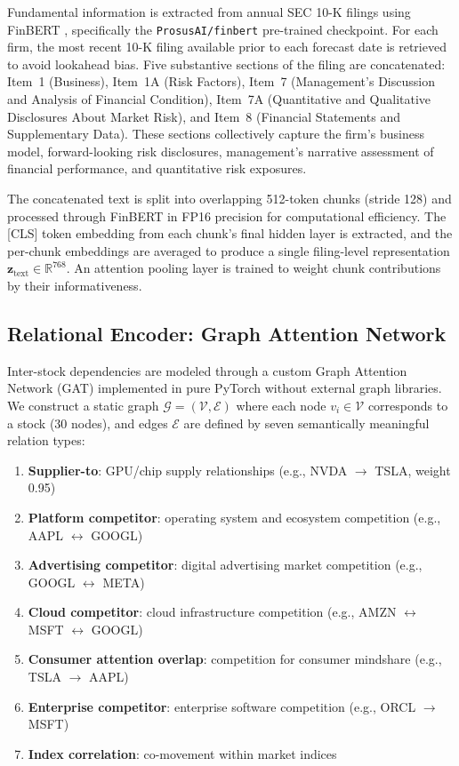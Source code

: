 \documentclass[12pt, a4paper]{article}
\begin{document}
Fundamental information is extracted from annual SEC 10-K filings using FinBERT \citep{yang2020finbert}, specifically the \texttt{ProsusAI/finbert} pre-trained checkpoint. For each firm, the most recent 10-K filing available prior to each forecast date is retrieved to avoid lookahead bias. Five substantive sections of the filing are concatenated: Item~1 (Business), Item~1A (Risk Factors), Item~7 (Management's Discussion and Analysis of Financial Condition), Item~7A (Quantitative and Qualitative Disclosures About Market Risk), and Item~8 (Financial Statements and Supplementary Data). These sections collectively capture the firm's business model, forward-looking risk disclosures, management's narrative assessment of financial performance, and quantitative risk exposures.

The concatenated text is split into overlapping 512-token chunks (stride 128) and processed through FinBERT in FP16 precision for computational efficiency. The [CLS] token embedding from each chunk's final hidden layer is extracted, and the per-chunk embeddings are averaged to produce a single filing-level representation $\mathbf{z}_{\text{text}} \in \mathbb{R}^{768}$. An attention pooling layer is trained to weight chunk contributions by their informativeness.

\subsection{Relational Encoder: Graph Attention Network}

Inter-stock dependencies are modeled through a custom Graph Attention Network (GAT) implemented in pure PyTorch without external graph libraries. We construct a static graph $\mathcal{G} = (\mathcal{V}, \mathcal{E})$ where each node $v_i \in \mathcal{V}$ corresponds to a stock (30 nodes), and edges $\mathcal{E}$ are defined by seven semantically meaningful relation types:

\begin{enumerate}[noitemsep]
    \item \textbf{Supplier-to}: GPU/chip supply relationships (e.g., NVDA $\to$ TSLA, weight 0.95)
    \item \textbf{Platform competitor}: operating system and ecosystem competition (e.g., AAPL $\leftrightarrow$ GOOGL)
    \item \textbf{Advertising competitor}: digital advertising market competition (e.g., GOOGL $\leftrightarrow$ META)
    \item \textbf{Cloud competitor}: cloud infrastructure competition (e.g., AMZN $\leftrightarrow$ MSFT $\leftrightarrow$ GOOGL)
    \item \textbf{Consumer attention overlap}: competition for consumer mindshare (e.g., TSLA $\to$ AAPL)
    \item \textbf{Enterprise competitor}: enterprise software competition (e.g., ORCL $\to$ MSFT)
    \item \textbf{Index correlation}: co-movement within market indices
\end{enumerate}
\end{document}
